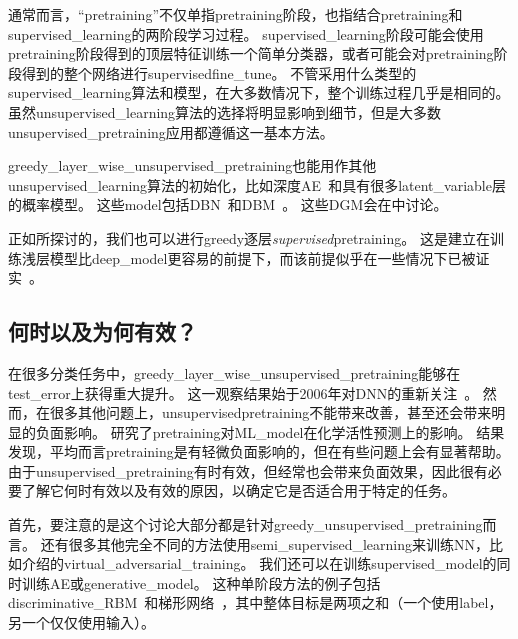 
通常而言，``\gls{pretraining}''不仅单指\gls{pretraining}阶段，也指结合\gls{pretraining}和\gls{supervised_learning}的两阶段学习过程。
\gls{supervised_learning}阶段可能会使用\gls{pretraining}阶段得到的顶层特征训练一个简单分类器，或者可能会对\gls{pretraining}阶段得到的整个网络进行\gls{supervised}\gls{fine_tune}。
不管采用什么类型的\gls{supervised_learning}算法和模型，在大多数情况下，整个训练过程几乎是相同的。
虽然\gls{unsupervised_learning}算法的选择将明显影响到细节，但是大多数\gls{unsupervised_pretraining}应用都遵循这一基本方法。


\gls{greedy_layer_wise_unsupervised_pretraining}也能用作其他\gls{unsupervised_learning}算法的初始化，比如深度\gls{AE}~\citep{Hinton-Science2006}和具有很多\gls{latent_variable}层的概率模型。
这些\gls{model}包括\gls{DBN}~\citep{Hinton06-small}和\gls{DBM}~\citep{Salakhutdinov+Hinton-2009-small}。
这些\gls{DGM}会在中讨论。


正如所探讨的，我们也可以进行\gls{greedy}逐层\emph{\gls{supervised}}\gls{pretraining}。
这是建立在训练浅层模型比\gls{deep_model}更容易的前提下，而该前提似乎在一些情况下已被证实~\citep{Erhan+al-2010-small}。


\subsection{何时以及为何有效？}
\label{sec:when_and_why_does_unsupervised_pretraining_work}


在很多分类任务中，\gls{greedy_layer_wise_unsupervised_pretraining}能够在\gls{test_error}上获得重大提升。
这一观察结果始于2006年对\gls{DNN}的重新关注~\citep{Hinton06-small,Bengio-nips-2006,ranzato-07-small}。
然而，在很多其他问题上，\gls{unsupervised}\gls{pretraining}不能带来改善，甚至还会带来明显的负面影响。
\cite{Ma-et-al-2015}研究了\gls{pretraining}对\gls{ML_model}在化学活性预测上的影响。
结果发现，平均而言\gls{pretraining}是有轻微负面影响的，但在有些问题上会有显著帮助。
由于\gls{unsupervised_pretraining}有时有效，但经常也会带来负面效果，因此很有必要了解它何时有效以及有效的原因，以确定它是否适合用于特定的任务。



首先，要注意的是这个讨论大部分都是针对\gls{greedy_unsupervised_pretraining}而言。
还有很多其他完全不同的方法使用\gls{semi_supervised_learning}来训练\gls{NN}，比如介绍的\gls{virtual_adversarial_training}。
我们还可以在训练\gls{supervised_model}的同时训练\gls{AE}或\gls{generative_model}。
这种单阶段方法的例子包括\gls{discriminative_RBM}~\citep{Larochelle+Bengio-2008}和梯形网络~\citep{Rasmus-et-al-arxiv2015}，其中整体目标是两项之和（一个使用\gls{label}，另一个仅仅使用输入）。

